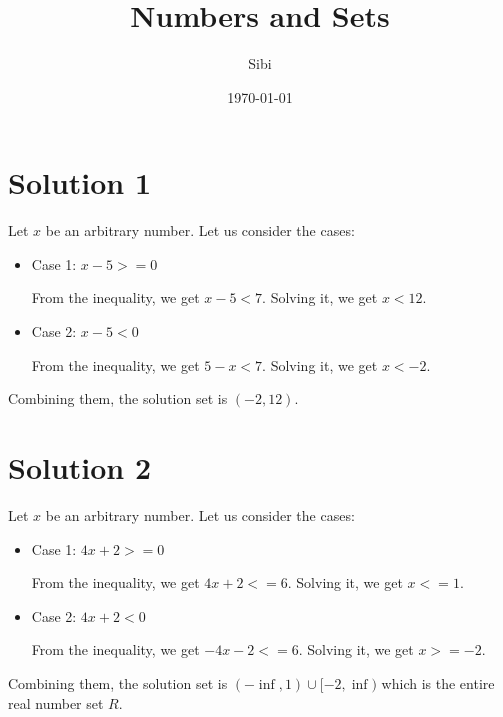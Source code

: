 \documentclass{article}
\begin{document}
\title{Numbers and Sets}
\author{Sibi}
\date{\today}
\maketitle

\DeclarePairedDelimiter\abs{\lvert}{\rvert}%
\DeclarePairedDelimiter\norm{\lVert}{\rVert}%

\makeatletter
\let\oldabs\abs
\def\abs{\@ifstar{\oldabs}{\oldabs*}}
% 
\let\oldnorm\norm
\def\norm{\@ifstar{\oldnorm}{\oldnorm*}}
\makeatother
\newpage

\section{Solution 1}

Let $x$ be an arbitrary number. Let us consider the cases:

\begin{itemize}
\item Case 1: $x - 5 >= 0$

  From the inequality, we get $x - 5 < 7$. Solving it, we get $x < 12$.
  
\item Case 2: $x - 5 < 0$

  From the inequality, we get $5 - x< 7$. Solving it, we get $x < -2$.
\end{itemize}

Combining them, the solution set is $(-2, 12)$.

\section{Solution 2}

Let $x$ be an arbitrary number. Let us consider the cases:

\begin{itemize}
\item Case 1: $4x + 2 >= 0$

  From the inequality, we get $4x + 2 <= 6$. Solving it, we get $x <= 1$.
  
\item Case 2: $4x + 2 < 0$

  From the inequality, we get $-4x - 2 <= 6$. Solving it, we get $x >= -2$.
\end{itemize}

Combining them, the solution set is $(-\inf, 1) \cup [-2, \inf)$ which
is the entire real number set $R$.
\end{document}
